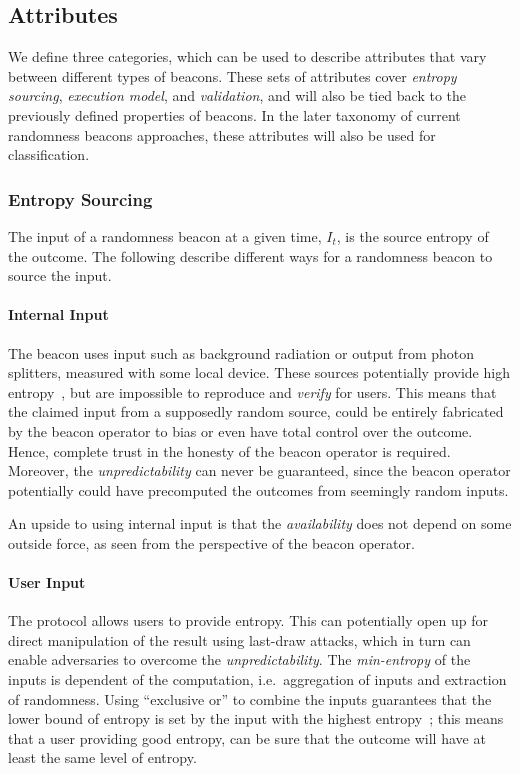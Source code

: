 \subsection{Attributes}
We define three categories, which can be used to describe attributes that vary between different types of beacons.
These sets of attributes cover \emph{entropy sourcing}, \emph{execution model}, and \emph{validation}, and will also be tied back to the previously defined properties of beacons.
In the later taxonomy of current randomness beacons approaches, these attributes will also be used for classification.

\subsubsection{Entropy Sourcing}
The input of a randomness beacon at a given time, $I_t$, is the source entropy of the outcome.
The following describe different ways for a randomness beacon to source the input.
\paragraph{Internal Input}
        The beacon uses input such as background radiation or output from photon splitters, measured with some local device.
        These sources potentially provide high entropy~\cite{nistbeacon}, but are impossible to reproduce and \emph{verify} for users.
        This means that the claimed input from a supposedly random source, could be entirely fabricated by the beacon operator to bias or even have total control over the outcome.
        Hence, complete trust in the honesty of the beacon operator is required.
        Moreover, the \emph{unpredictability} can never be guaranteed, since the beacon operator potentially could have precomputed the outcomes from seemingly random inputs.

        An upside to using internal input is that the \emph{availability} does not depend on some outside force, as seen from the perspective of the beacon operator.
\paragraph{User Input}
        The protocol allows users to provide entropy.
        This can potentially open up for direct manipulation of the result using last-draw attacks, which in turn can enable adversaries to overcome the \emph{unpredictability}.
        The \emph{min-entropy} of the inputs is dependent of the computation, i.e.\ aggregation of inputs and extraction of randomness.
        Using \enquote{exclusive or} to combine the inputs guarantees that the lower bound of entropy is set by the input with the highest entropy~\cite{lenstra2015random};
        this means that a user providing good entropy, can be sure that the outcome will have at least the same level of entropy.

